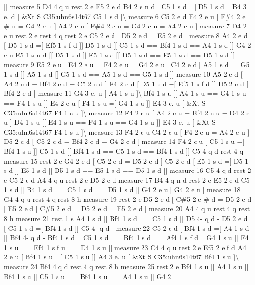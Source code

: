 \mbox{]}\mbox{]} measure 5 D4 4 q u rest 2 e F5 2 e d B4 2 e n d \mbox{[} C5 1 s d =\mbox{[} D5 1 s d \mbox{]}\mbox{]} B4 3 e. d \mbox{[} \&Xt S C35\+:uhn6s14t67 C5 1 s d \mbox{]}\textbackslash{} measure 6 C5 2 e d E4 2 e u \mbox{[} F\#4 2 e \# u = G4 2 e u \mbox{]} A4 2 e u \mbox{[} F\#4 2 e u = G4 2 e u = A4 2 e u \mbox{]} measure 7 D4 2 e u rest 2 e rest 4 q rest 2 e C5 2 e d \mbox{[} D5 2 e d = E5 2 e d \mbox{]} measure 8 A4 2 e d \mbox{[} D5 1 s d =\mbox{[} Ef5 1 s f d \mbox{]}\mbox{]} D5 1 s d \mbox{[}\mbox{[} C5 1 s d == Bf4 1 s d == A4 1 s d \mbox{]}\mbox{]} G4 2 e u E5 1 s n d \mbox{[}\mbox{[} D5 1 s d \mbox{]}\mbox{]} E5 1 s d \mbox{[}\mbox{[} D5 1 s d == E5 1 s d == D5 1 s d \mbox{]}\mbox{]} measure 9 E5 2 e u \mbox{[} E4 2 e u = F4 2 e u = G4 2 e u \mbox{]} C4 2 e d \mbox{[} A5 1 s d =\mbox{[} G5 1 s d \mbox{]}\mbox{]} A5 1 s d \mbox{[}\mbox{[} G5 1 s d == A5 1 s d == G5 1 s d \mbox{]}\mbox{]} measure 10 A5 2 e d \mbox{[} A4 2 e d = Bf4 2 e d = C5 2 e d \mbox{]} F4 2 e d \mbox{[} D5 1 s d =\mbox{[} Ef5 1 s f d \mbox{]}\mbox{]} D5 2 e d \mbox{[} Bf4 2 e d \mbox{]} measure 11 G4 3 e. u \mbox{[} A4 1 s u \mbox{]}\textbackslash{} Bf4 1 s u \mbox{[}\mbox{[} A4 1 s u == G4 1 s u == F4 1 s u \mbox{]}\mbox{]} E4 2 e u \mbox{[} F4 1 s u =\mbox{[} G4 1 s u \mbox{]}\mbox{]} E4 3 e. u \mbox{[} \&Xt S C35\+:uhn6s14t67 F4 1 s u \mbox{]}\textbackslash{} measure 12 F4 2 e u \mbox{[} A4 2 e u = Bf4 2 e u = D4 2 e u \mbox{]} D4 1 s u \mbox{[}\mbox{[} E4 1 s u == F4 1 s u == G4 1 s u \mbox{]}\mbox{]} E4 3 e. u \mbox{[} \&Xt S C35\+:uhn6s14t67 F4 1 s u \mbox{]}\textbackslash{} measure 13 F4 2 e u C4 2 e u \mbox{[} F4 2 e u = A4 2 e u \mbox{]} D5 2 e d \mbox{[} C5 2 e d = Bf4 2 e d = G4 2 e d \mbox{]} measure 14 F4 2 e u \mbox{[} C5 1 s u =\mbox{[} Bf4 1 s u \mbox{]}\mbox{]} C5 1 s d \mbox{[}\mbox{[} Bf4 1 s d == C5 1 s d == Bf4 1 s d \mbox{]}\mbox{]} C5 4 q d rest 4 q measure 15 rest 2 e G4 2 e d \mbox{[} C5 2 e d = D5 2 e d \mbox{]} C5 2 e d \mbox{[} E5 1 s d =\mbox{[} D5 1 s d \mbox{]}\mbox{]} E5 1 s d \mbox{[}\mbox{[} D5 1 s d == E5 1 s d == D5 1 s d \mbox{]}\mbox{]} measure 16 C5 4 q d rest 2 e C5 2 e d A4 4 q u rest 2 e D5 2 e d measure 17 B4 4 q n d rest 2 e E5 2 e d C5 1 s d \mbox{[}\mbox{[} B4 1 s d == C5 1 s d == D5 1 s d \mbox{]}\mbox{]} G4 2 e u \mbox{[} G4 2 e u \mbox{]} measure 18 G4 4 q u rest 4 q rest 8 h measure 19 rest 2 e D5 2 e d \mbox{[} C\#5 2 e \# d = D5 2 e d \mbox{]} E5 2 e d \mbox{[} C\#5 2 e d = D5 2 e d = E5 2 e d \mbox{]} measure 20 A4 4 q u rest 4 q rest 8 h measure 21 rest 1 s A4 1 s d \mbox{[}\mbox{[} Bf4 1 s d == C5 1 s d \mbox{]}\mbox{]} D5 4-\/ q d -\/ D5 2 e d \mbox{[} C5 1 s d =\mbox{[} Bf4 1 s d \mbox{]}\mbox{]} C5 4-\/ q d -\/ measure 22 C5 2 e d \mbox{[} Bf4 1 s d =\mbox{[} A4 1 s d \mbox{]}\mbox{]} Bf4 4-\/ q d -\/ Bf4 1 s d \mbox{[}\mbox{[} C5 1 s d == Bf4 1 s d == Af4 1 s f d \mbox{]}\mbox{]} G4 1 s u \mbox{[}\mbox{[} F4 1 s u == Ef4 1 s f u == D4 1 s u \mbox{]}\mbox{]} measure 23 C4 4 q u rest 2 e Ef5 2 e f d A4 2 e u \mbox{[} Bf4 1 s u =\mbox{[} C5 1 s u \mbox{]}\mbox{]} A4 3 e. u \mbox{[} \&Xt S C35\+:uhn6s14t67 Bf4 1 s u \mbox{]}\textbackslash{} measure 24 Bf4 4 q d rest 4 q rest 8 h measure 25 rest 2 e Bf4 1 s u \mbox{[}\mbox{[} A4 1 s u \mbox{]}\mbox{]} Bf4 1 s u \mbox{[}\mbox{[} C5 1 s u == Bf4 1 s u == A4 1 s u \mbox{]}\mbox{]} G4 2 